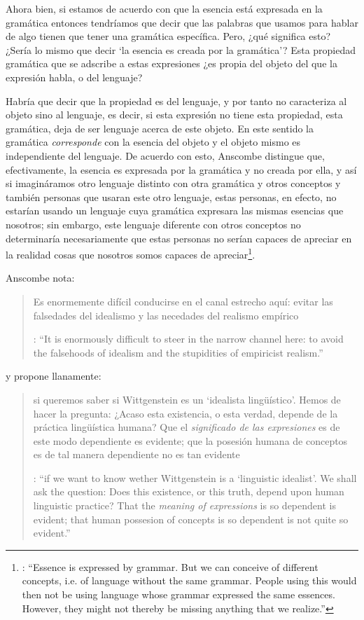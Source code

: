 Ahora bien, si estamos de acuerdo con que la esencia está expresada en la gramática entonces tendríamos que decir que las palabras que usamos para hablar de algo tienen que tener una gramática específica. Pero, ¿qué significa esto? ¿Sería lo mismo que decir \enquote*{la esencia es creada por la gramática}? Esta propiedad gramática que se adscribe a estas expresiones ¿es propia del objeto del que la expresión habla, o del lenguaje?

Habría que decir que la propiedad es del lenguaje, y por tanto no caracteriza al objeto sino al lenguaje, es decir, si esta expresión no tiene esta propiedad, esta gramática, deja de ser lenguaje acerca de este objeto. En este sentido la gramática \emph{corresponde} con la esencia del objeto y el objeto mismo es independiente del lenguaje. De acuerdo con esto, Anscombe distingue que, efectivamente, la esencia es expresada por la gramática y no creada por ella, y así si imagináramos otro lenguaje distinto con otra gramática y otros conceptos y también personas que usaran este otro lenguaje, estas personas, en efecto, no estarían usando un lenguaje cuya gramática expresara las mismas esencias que nosotros; sin embargo, este lenguaje diferente con otros conceptos no determinaría necesariamente que estas personas no serían capaces de apreciar en la realidad cosas que nosotros somos capaces de apreciar\footnote{\cite[Cf.~][115]{anscombe1981parmenides:qli}: \enquote{Essence is expressed by grammar. But we can conceive of different concepts, i.e. of language without the same grammar. People using this would then not be using language whose grammar expressed the same essences. However, they might not thereby be missing anything that we realize.}}.

Anscombe nota: \blockquote[{\cite[115]{anscombe1981parmenides:qli}}: \enquote{It is enormously difficult to steer in the narrow channel here: to avoid the falsehoods of idealism and the stupidities of empiricist realism.}]{Es enormemente difícil conducirse en el canal estrecho aquí: evitar las falsedades del idealismo y las necedades del realismo empírico}. y propone llanamente: \blockquote[{\cite[116]{anscombe1981parmenides:qli}}: \enquote{if we want to know wether Wittgenstein is a `linguistic idealist'. We shall ask the question: Does this existence, or this truth, depend upon human linguistic practice? That the \emph{meaning of expressions} is so dependent is evident; that human possesion of concepts is so dependent is not quite so evident.}]{si queremos saber si Wittgenstein es un `idealista lingüístico'. Hemos de hacer la pregunta: ¿Acaso esta existencia, o esta verdad, depende de la práctica lingüística humana? Que el \emph{significado de las expresiones} es de este modo dependiente es evidente; que la posesión humana de conceptos es de tal manera dependiente no es tan evidente}.

